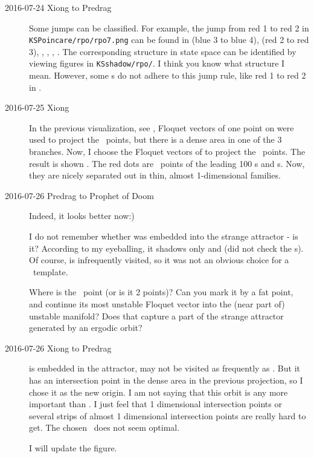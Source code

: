 \begin{description}
\item[2016-07-24 Xiong to Predrag]
Some jumps can be classified. For example, the jump from red 1 to
red 2 in \texttt{KSPoincare/rpo/rpo7.png} can be found in
 (blue 3 to blue 4),  (red 2 to red 3), , ,
, . The corresponding structure in state space
can be identified by viewing figures in \texttt{KSshadow/rpo/}. I think you know
what structure I mean.
However, some \rpo s do not adhere to this jump rule, like red 1 to red 2 in .

\item[2016-07-25 Xiong]
In the 
{previous visualization}, see , Floquet vectors
of one point on  were used to project the \PoincSec\ points, but
there is a dense area in one of the 3 branches. Now, I choose the Floquet
vectors of  to project the \PoincSec\ points. The result is shown
. The
red dots are \PoincSec\ points of the leading 100 \rpo s and \ppo s. Now,
they are nicely separated out in thin, almost 1-dimensional families.

\item[2016-07-26 Predrag to Prophet of Doom]
Indeed, it looks better now:)

I do not remember whether  was embedded into the strange attractor
- is it? According to my eyeballing, it shadows only  and
 (did not check the \ppo s). Of course,  is infrequently
visited, so it was not an obvious choice for a \PoincSec\ template.

Where is the  \PoincSec\ point (or is it 2 points)? Can you mark
it by a fat point, and continue its most unstable Floquet vector into the
(near part of) unstable manifold? Does that capture a part of the strange
attractor generated by an ergodic orbit?

\item[2016-07-26 Xiong to Predrag]
 is embedded in the attractor, may not be visited as frequently
as . But it has an intersection point in the dense area in the
previous projection, so I chose it as the new origin. I am not saying
that this orbit is any more important than .
I just feel that 1 dimensional intersection points or several strips of
almost 1 dimensional intersection points are really hard to get.
The chosen \PoincSec\ does not seem optimal.

I will update the figure.


\end{description}
